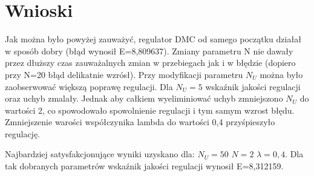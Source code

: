 \section{Wnioski}
Jak można było powyżej zauważyć, regulator DMC od samego początku działał w sposób dobry (błąd wynosił E=8,809637).
Zmiany parametru N nie dawały przez dłuższy czas zauważalnych zmian w przebiegach jak i w błędzie (dopiero przy N=20 błąd delikatnie wzrósł).
Przy modyfikacji parametru $N_U$ można było zaobserwować większą poprawę regulacji. Dla $N_U=5$ wskaźnik jakości regulacji oraz uchyb zmalały.
Jednak aby całkiem wyeliminiować uchyb zmniejszono $N_U$ do wartości 2, co spowodowało spowolnienie regulacji i tym samym wzrost błędu. 
Zmniejszenie warości współczynika lambda do wartości 0,4 przyśpieszyło regulację.

Najbardziej satysfakcjonujące wyniki uzyskano dla: $N_U=50$ $N=2$ $\lambda=0,4$. Dla tak dobranych parametrów wskaźnik jakości regulacji wynosił E=8,312159.

\smallskip

